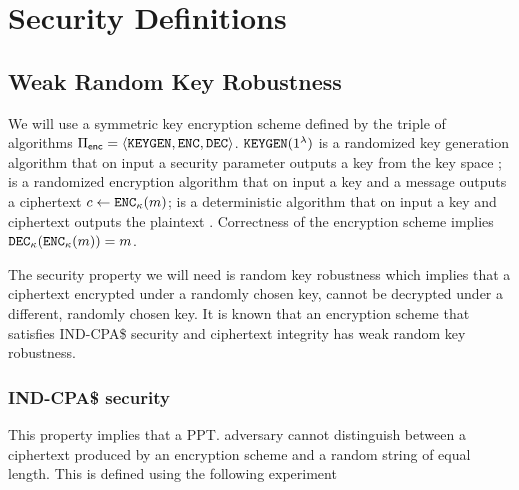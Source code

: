 
\section{Security Definitions }
\label{app:secdef}


\subsection{Weak Random Key Robustness}
\label{app:secdef:random_key}
We will use a symmetric key encryption scheme defined by the triple of algorithms $\encryptionSchemeDefn$. $\encryptKeyGen(1^\secParam)$ is a randomized key generation algorithm that on input a security parameter outputs a key \genericSymmKey from the key space \encryptKeySpace; \encrypt is a randomized encryption algorithm that on input a key \genericSymmKey and a message \plaintext outputs a ciphertext $\ciphertext \assign \encrypt[\genericSymmKey](\plaintext)$; \decrypt is a deterministic algorithm that on input a key \genericSymmKey and ciphertext \ciphertext outputs the plaintext \plaintext. Correctness of the encryption scheme implies $\decrypt[\genericSymmKey](\encrypt[\genericSymmKey](\plaintext)) = \plaintext$. 

The security property we will need is random key robustness which implies that a ciphertext encrypted under a randomly chosen key, cannot be decrypted under a different, randomly chosen key. It is known that an encryption scheme that satisfies IND-CPA\$ security and ciphertext integrity has weak random key robustness.


\subsubsection{IND-CPA\$ security}
\label{sec:defn:ind_cpa}
%
This property implies that a PPT. adversary cannot distinguish between a ciphertext produced by an encryption scheme \encryptionSchemeDefn and a 
random string of equal length. This is defined using the following experiment 



